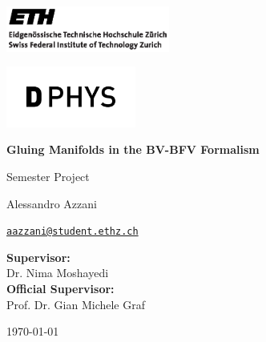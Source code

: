 \begin{titlepage}
    \noindent
    \begin{minipage}{0.4\textwidth}
        \begin{flushleft}
            \includegraphics[height=1.5cm]{Title/eth_logo_2.eps}
        \end{flushleft}
    \end{minipage}
    \hfill
    \begin{minipage}{0.4\textwidth}
        \begin{flushright}
            \includegraphics[height=2cm]{Title/dphys.png}
        \end{flushright}
    \end{minipage}

    \vspace{3cm}

    \begin{center}
        \begin{spacing}{2.0}
            {\huge \bfseries Gluing Manifolds in the BV-BFV Formalism}
        \end{spacing}

        \large
        Semester Project
    \end{center}

    \vspace{0.4cm}

    \begin{center}
        \large
        Alessandro Azzani

        \begingroup
            \hypersetup{urlcolor=black}
            \href{mailto:aazzani@student.ethz.ch}
            {\texttt{\small aazzani@student.ethz.ch}} 
        \endgroup
    \end{center}

    \vfill

    \begin{center}
        \textbf{Supervisor:} \\
        Dr. Nima Moshayedi \\

        \vspace{0.2cm}
        \textbf{Official Supervisor:} \\
        Prof. Dr. Gian Michele Graf
    \end{center}

    \vspace{0.2cm}

    \begin{center}
        \today
    \end{center}
\end{titlepage}